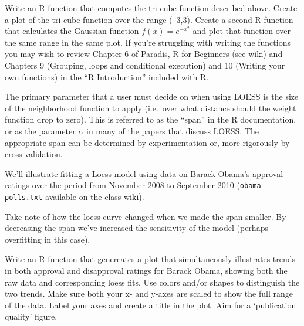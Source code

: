 \medskip
\begin{assignment}
Write an R function that computes the tri-cube
function described above. Create a plot of the tri-cube function over
the range (--3,3). Create a second R function that calculates the
Gaussian function $f(x) = e^{-x^2}$ and plot that function over the same
range in the same plot. If you're struggling with writing the functions
you may wish to review Chapter 6 of Paradis, R for Beginners (see wiki)
and Chapters 9 (Grouping, loops and conditional execution) and 10
(Writing your own functions) in the ``R Introduction'' included with R.
\end{assignment}

The primary parameter that a user must decide on when using LOESS is the
size of the neighborhood function to apply (i.e.~over what distance
should the weight function drop to zero). This is referred to as the
``span'' in the R documentation, or as the parameter $\alpha$ in many of
the papers that discuss LOESS. The appropriate span can be determined by
experimentation or, more rigorously by cross-validation.

We'll illustrate fitting a Loess model using data on Barack Obama's
approval ratings over the period from November 2008 to September 2010
(\lstinline!obama-polls.txt! available on the class wiki).

Take note of how the loess curve changed when we made the span smaller.
By decreasing the span we've increased the sensitivity of the model
(perhaps overfitting in this case).

\medskip
\begin{assignment}
Write an R function that genereates a plot that
simultaneously illustrates trends in both approval and disapproval
ratings for Barack Obama, showing both the raw data and corresponding
loess fits. Use colors and/or shapes to distinguish the two trends. Make
sure both your x- and y-axes are scaled to show the full range of the
data. Label your axes and create a title in the plot. Aim for a
`publication quality' figure.
\end{assignment}





